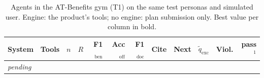 \begin{table}[t]
\centering
\footnotesize
\caption{Agents in the AT-Benefits gym (T1) on the same test personas and simulated user. Engine: the product's tools; no engine: plan submission only. Best value per column in bold.}
\label{tab:t1}
\setlength{\tabcolsep}{4pt}
\begin{tabular}{llrrrrrrrrrr}
\toprule
System & Tools & $n$ & $R$ & F1$_\text{ben}$ & Acc$_\text{off}$ & F1$_\text{doc}$ & Cite & Next & $\tilde{q}_{\text{exc}}$ & Viol. & pass$^1$ \\
\midrule
\emph{pending} &  &  &  &  &  &  &  &  &  &  &  \\
\bottomrule
\end{tabular}
\par{}
\end{table}
